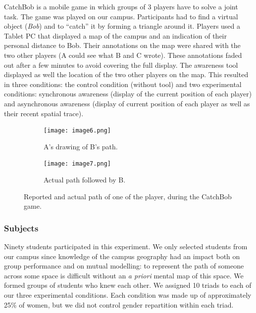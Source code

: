 \documentclass[natbib]{svjour3}
\newcommand{\A}{A\xspace}
\newcommand{\B}{B\xspace}
\newcommand{\C}{C\xspace}
\begin{document}
{\sc CatchBob} is a mobile game in which groups of 3 players have to solve a
joint task. The game was played on our campus. Participants had to find a
virtual object (\emph{Bob}) and to ``catch'' it by forming a triangle around it.
Players used a Tablet PC that displayed a map of the campus and an indication of
their personal distance to Bob. Their annotations on the map were shared with
the two other players (\A could see what \B and \C wrote). These annotations
faded out after a few minutes to avoid covering the full display. The awareness
tool displayed as well the location of the two other players on the map. This
resulted in three conditions: the control condition (without tool) and two
experimental conditions: synchronous awareness (display of the current position
of each player) and asynchronous awareness (display of current position of each
player as well as their recent spatial trace).

\begin{figure}[h!t]
        \centering
        \begin{subfigure}{.45\textwidth}
            \texttt{[image: image6.png]}
            \caption{A's drawing of \B's path.}
        \end{subfigure}
        \begin{subfigure}{.4\textwidth}
            \texttt{[image: image7.png]}
            \caption{Actual path followed by \B.}
        \end{subfigure}
        \caption{Reported and actual path of one of the player, during the {\sc
        CatchBob} game.}
        \label{study2:paths}
\end{figure}

\subsubsection*{Subjects}


Ninety students participated in this experiment. We only selected students from
our campus since knowledge of the campus geography had an impact both on group
performance and on mutual modelling: to represent the path of someone across
some space is difficult without an \textit{a priori} mental map of this space.
We formed groups of students who knew each other. We assigned 10 triads to each
of our three experimental conditions. Each condition was made up of
approximately 25\% of women, but we did not control gender repartition within
each triad.
\end{document}
